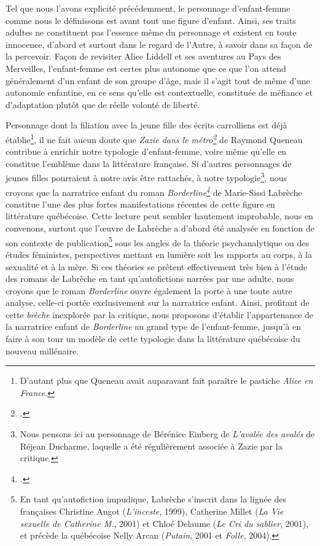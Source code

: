 Tel que nous l'avons explicité précédemment, le personnage d'enfant-femme comme nous le définissons est avant tout une figure d'enfant. Ainsi, ses traits adultes ne constituent pas l'essence même du personnage et existent en toute innocence, d'abord et surtout dans le regard de l'Autre, à savoir dans sa façon de la percevoir.
Façon de revisiter Alice Liddell et ses aventures au Pays des Merveilles, l'enfant-femme est certes plus autonome que ce que l'on attend généralement d'un enfant de son groupe d'âge, mais il s'agit tout de même d'une autonomie enfantine, en ce sens qu'elle est contextuelle, constituée de méfiance et d'adaptation plutôt que de réelle volonté de liberté.
\par
Personnage dont la filiation avec la jeune fille des écrits carrolliens est déjà établie\footnote{D'autant plus que Queneau avait auparavant fait paraître le pastiche \textit{Alice en France}.}, il ne fait aucun doute que \textit{Zazie dans le métro\footcite{Queneau1959}} de Raymond Queneau contribue à enrichir notre typologie d'enfant-femme, voire même qu'elle en constitue l'emblème dans la littérature française.
Si d'autres personnages de jeunes filles pourraient à notre avis être rattachés, à notre typologie\footnote{Nous pensons ici au personnage de Bérénice Einberg de \textit{L'avalée des avalés} de Réjean Ducharme, laquelle a été régulièrement associée à Zazie par la critique.}, nous croyons que la narratrice enfant du roman \textit{Borderline\footcite{Labreche2003}} de Marie-Sissi Labrèche constitue l'une des plus fortes manifestations récentes de cette figure en littérature québécoise.
Cette lecture peut sembler hautement improbable, nous en convenons, surtout que l'\oe{}uvre de Labrèche a d'abord été analysée en fonction de son contexte de publication\footnote{En tant qu'autofiction impudique, Labrèche s'inscrit dans la lignée des françaises Christine Angot (\textit{L'inceste}, 1999), Catherine Millet (\textit{La Vie sexuelle de Catherine M.}, 2001) et Chloé Delaume (\textit{Le Cri du sablier}, 2001), et précède la québécoise Nelly Arcan (\textit{Putain}, 2001 et \textit{Folle}, 2004).} sous les angles de la théorie psychanalytique ou des études féministes, perspectives mettant en lumière soit les rapports au corps, à la sexualité et à la mère.
Si ces théories se prêtent effectivement très bien à l'étude des romans de Labrèche en tant qu'autofictions narrées par une adulte, nous croyons que le roman \textit{Borderline} ouvre également la porte à une toute autre analyse, celle-ci portée exclusivement sur la narratrice enfant.
Ainsi, profitant de cette \textit{brèche} inexplorée par la critique, nous proposons d'établir l'appartenance de la narratrice enfant de \textit{Borderline} au grand type de l'enfant-femme, jusqu'à en faire à son tour un modèle de cette typologie dans la littérature québécoise du nouveau millénaire.


